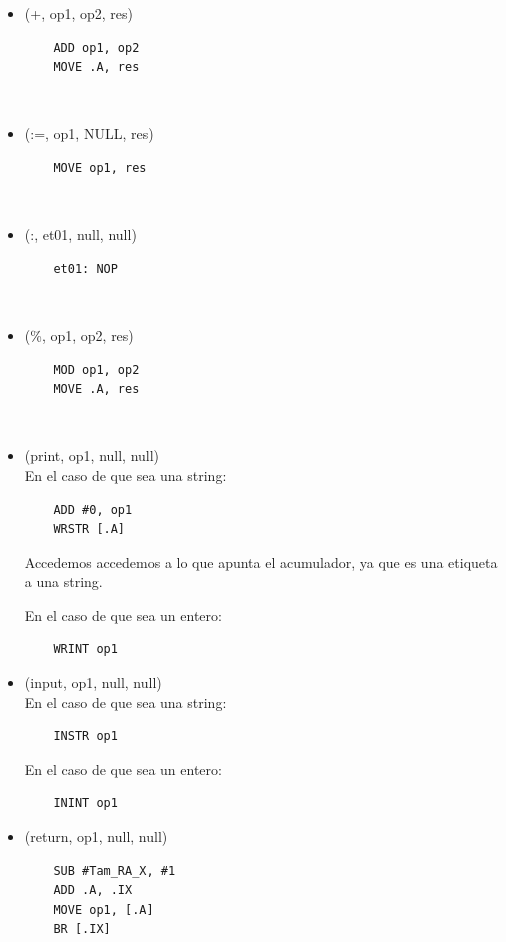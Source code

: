 \documentclass{article}[a4paper]
\begin{document}
\begin{itemize}

\item (+, op1, op2, res)
\begin{verbatim}
    ADD op1, op2
    MOVE .A, res
\end{verbatim}\\

\item (:=, op1, NULL, res)
\begin{verbatim}
    MOVE op1, res
\end{verbatim}\\

\item (:, et01, null, null)
\begin{verbatim}
    et01: NOP
\end{verbatim}\\

\item (\%, op1, op2, res)
\begin{verbatim}
    MOD op1, op2
    MOVE .A, res
\end{verbatim}\\

\item (print, op1, null, null)\\
En el caso de que sea una string:
\begin{verbatim}
    ADD #0, op1
    WRSTR [.A]
\end{verbatim}
Accedemos accedemos a lo que apunta el acumulador, ya que es una etiqueta a una string.

En el caso de que sea un entero:
\begin{verbatim}
    WRINT op1
\end{verbatim}

\item (input, op1, null, null)\\
En el caso de que sea una string:
\begin{verbatim}
    INSTR op1
\end{verbatim}
En el caso de que sea un entero:
\begin{verbatim}
    ININT op1
\end{verbatim}

\item (return, op1, null, null)
\begin{verbatim}
    SUB #Tam_RA_X, #1
    ADD .A, .IX
    MOVE op1, [.A]
    BR [.IX]
\end{verbatim}


\end{itemize}
\end{document}
